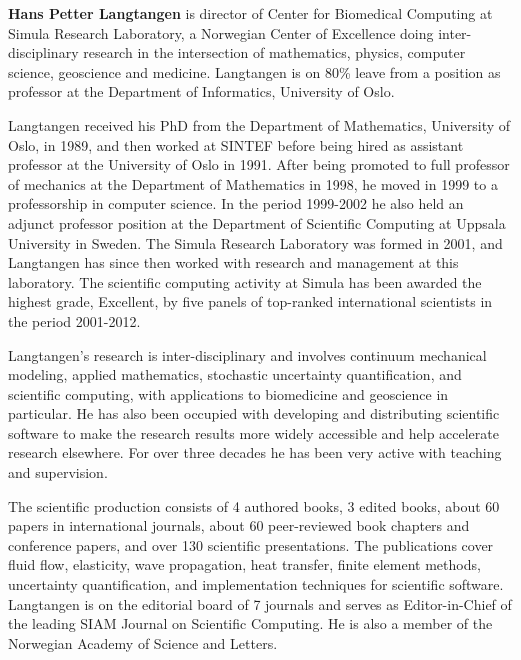 \begin{participant}[type=leadPI, gender=male, PM = 8]{\bf Hans Petter Langtangen}
 is director of Center for Biomedical Computing at Simula Research Laboratory, a Norwegian Center of Excellence doing inter-disciplinary research in the intersection of mathematics, physics, computer science, geoscience and medicine. Langtangen is on 80\% leave from a position as professor at the Department of Informatics, University of Oslo.

Langtangen received his PhD from the Department of Mathematics, University of Oslo, in 1989, and then worked at SINTEF before being hired as assistant professor at the University of Oslo in 1991. After being promoted to full professor of mechanics at the Department of Mathematics in 1998, he moved in 1999 to a professorship in computer science. In the period 1999-2002 he also held an adjunct professor position at the Department of Scientific Computing at Uppsala University in Sweden. The Simula Research Laboratory was formed in 2001, and Langtangen has since then worked with research and management at this laboratory. The scientific computing activity at Simula has been awarded the highest grade, Excellent, by five panels of top-ranked international scientists in the period 2001-2012.

Langtangen's research is inter-disciplinary and involves continuum mechanical modeling, applied mathematics, stochastic uncertainty quantification, and scientific computing, with applications to biomedicine and geoscience in particular. He has also been occupied with developing and distributing scientific software to make the research results more widely accessible and help accelerate research elsewhere. For over three decades he has been very active with teaching and supervision.

The scientific production consists of 4 authored books, 3 edited books, about 60 papers in international journals, about 60 peer-reviewed book chapters and conference papers, and over 130 scientific presentations. The publications cover fluid flow, elasticity, wave propagation, heat transfer, finite element methods, uncertainty quantification, and implementation techniques for scientific software. Langtangen is on the editorial board of 7 journals and serves as Editor-in-Chief of the leading SIAM Journal on Scientific Computing. He is also a member of the Norwegian Academy of Science and Letters.

\end{participant}
